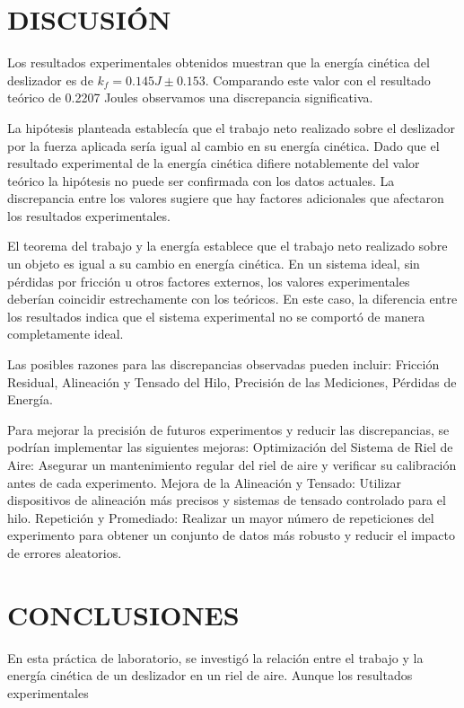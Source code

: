 \documentclass[journal]{IEEEtran}
\begin{document}
\section{DISCUSIÓN}
Los resultados experimentales obtenidos muestran que la energía cinética del deslizador es de \(k_f = 0.145J \pm 0.153\).
 Comparando este valor con el resultado teórico de 
0.2207
Joules observamos una discrepancia significativa.

La hipótesis planteada establecía que el trabajo neto realizado sobre el deslizador por la fuerza aplicada sería igual al cambio en su energía cinética. Dado que el resultado experimental de la energía cinética difiere notablemente del valor teórico 
 la hipótesis no puede ser confirmada con los datos actuales. La discrepancia entre los valores sugiere que hay factores adicionales que afectaron los resultados experimentales.

El teorema del trabajo y la energía establece que el trabajo neto realizado sobre un objeto es igual a su cambio en energía cinética. En un sistema ideal, sin pérdidas por fricción u otros factores externos, los valores experimentales deberían coincidir estrechamente con los teóricos. En este caso, la diferencia entre los resultados indica que el sistema experimental no se comportó de manera completamente ideal.

Las posibles razones para las discrepancias observadas pueden incluir: Fricción Residual, Alineación y Tensado del Hilo, Precisión de las Mediciones, Pérdidas de Energía.

Para mejorar la precisión de futuros experimentos y reducir las discrepancias, se podrían implementar las siguientes mejoras:
Optimización del Sistema de Riel de Aire: Asegurar un mantenimiento regular del riel de aire y verificar su calibración antes de cada experimento.
Mejora de la Alineación y Tensado: Utilizar dispositivos de alineación más precisos y sistemas de tensado controlado para el hilo.
Repetición y Promediado: Realizar un mayor número de repeticiones del experimento para obtener un conjunto de datos más robusto y reducir el impacto de errores aleatorios.

\section{ CONCLUSIONES} 
En esta práctica de laboratorio, se investigó la relación entre el trabajo y la energía cinética de un deslizador en un riel de aire. Aunque los resultados experimentales 
\end{document}

